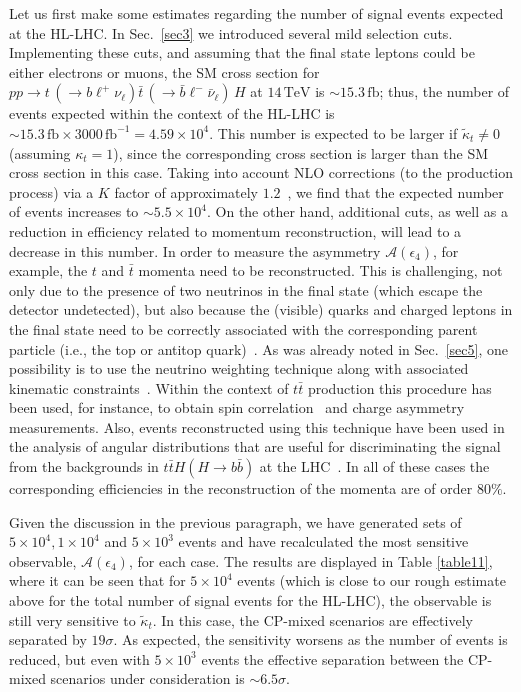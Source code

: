 \documentclass[aps,preprint,tightenlines,floatfix,superscriptaddress,nofootinbib,showpacs]{revtex4-1}
\def\tbar{\bar{t}}
\def\bbar{\bar{b}}
\def\nubar{{\bar{\nu}}_{\ell}}
\def\ppprocess{pp\to t\,\left(\rightarrow b {\ell}^+ \nu_{\ell}\right) \tbar\,\left(\rightarrow\bbar {\ell}^-\nubar\right)\,H}
\def\kp{\kappa_t}
\def\kpt{\tilde{\kappa}_t}
\begin{document}
Let us first make some estimates regarding the number of signal events
expected at the HL-LHC.
In Sec.~\ref{sec3} we introduced several mild selection cuts.
Implementing these cuts, and assuming that the final state leptons
could be either electrons or muons, the SM cross section for $\ppprocess$ at
$14\,\mathrm{TeV}$ is $\sim 15.3\,\mathrm{fb}$; thus, the number of
events expected within the context of the HL-LHC is $\sim
15.3\,\mathrm{fb} \times 3000\,\mathrm{fb}^{-1} = 4.59\times
10^4$. This number is expected to be larger
if $\kpt\neq 0$ (assuming $\kp=1$),
since the corresponding cross section is
larger than the SM cross section in this case.
Taking into account NLO corrections (to the
production process) via a $K$ factor of approximately
$1.2$~\cite{Dawson,Beenakker,Dittmaier}, we find that
the expected number of
events increases to $\sim 5.5 \times 10^4$.
On the other hand, additional cuts, as
well as a reduction in efficiency related to momentum reconstruction,
will lead to a decrease in this number.  In
order to measure the asymmetry $\mathcal{A}(\epsilon_4)$,
for example, the $t$ and $\tbar$
momenta need to be reconstructed. This is challenging, not only due to
the presence of two neutrinos in the final state (which escape the
detector undetected), but also because the (visible) quarks and charged leptons in the final
state need to be correctly associated with the corresponding
parent particle (i.e., the top or antitop quark)~\cite{atlasconf}.
As was
already noted in Sec.~\ref{sec5}, one possibility is to use the
neutrino weighting technique along with associated kinematic constraints~\cite{atlasconf,atlascharge,dosSantos}.
Within the context of $t\tbar$ production this
procedure has been used, for instance, to obtain 
spin correlation~\cite{atlasconf} and charge
asymmetry~\cite{atlascharge} measurements.
Also, events reconstructed using this technique have
been used in the analysis of angular distributions that
are useful for discriminating the signal from the backgrounds in
$t\tbar H (H\rightarrow b\bbar)$ at the LHC~\cite{dosSantos}.
 In all of these cases the corresponding
efficiencies in the reconstruction of the momenta are of order $80\%$.

Given the discussion in the previous paragraph, we
have generated sets of $5\times 10^4, 1\times 10^4$ and $5\times 10^3$
events and have recalculated the most sensitive observable, 
$\mathcal{A}(\epsilon_4)$, for each case. The results are displayed in
Table \ref{table11}, where it can be seen that for $5\times 10^4$ events
(which is close to our rough estimate above for the
total number of signal events for the
HL-LHC), 
the observable is still very sensitive to $\kpt$.
In this case, the $\mathrm{CP}$-mixed scenarios are
effectively separated by $19\sigma$. As expected, the
sensitivity worsens as the number of events is reduced, but even with
$5\times 10^3$ events the effective separation between the $\mathrm{CP}$-mixed
scenarios under consideration is $\sim 6.5\sigma$. \par
\end{document}
